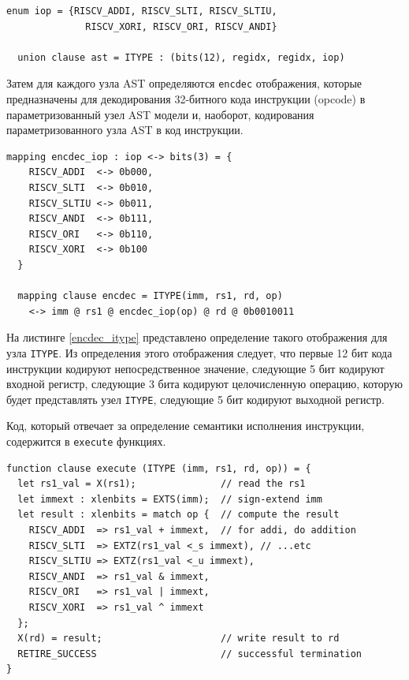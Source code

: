 
\begin{lstlisting}[caption={Пример определения узла AST в sail-riscv}, language=sail, frame=single, label=itype]
  enum iop = {RISCV_ADDI, RISCV_SLTI, RISCV_SLTIU,
              RISCV_XORI, RISCV_ORI, RISCV_ANDI}

  union clause ast = ITYPE : (bits(12), regidx, regidx, iop)
\end{lstlisting}

Затем для каждого узла AST определяются \texttt{encdec} отображения, которые предназначены для декодирования 32-битного кода инструкции (opcode) в параметризованный узел AST модели и, наоборот, кодирования параметризованного узла AST в код инструкции.

\begin{lstlisting}[caption={Пример определения функции кодирования и декодирования инструкций в sail-riscv}, language=sail, frame=single, label=encdec_itype]
  mapping encdec_iop : iop <-> bits(3) = {
    RISCV_ADDI  <-> 0b000,
    RISCV_SLTI  <-> 0b010,
    RISCV_SLTIU <-> 0b011,
    RISCV_ANDI  <-> 0b111,
    RISCV_ORI   <-> 0b110,
    RISCV_XORI  <-> 0b100
  }

  mapping clause encdec = ITYPE(imm, rs1, rd, op)
    <-> imm @ rs1 @ encdec_iop(op) @ rd @ 0b0010011
\end{lstlisting}

На листинге \ref{encdec_itype} представлено определение такого отображения для узла \texttt{ITYPE}.
Из определения этого отображения следует, что первые 12 бит кода инструкции кодируют непосредственное значение, следующие 5 бит кодируют входной регистр, следующие 3 бита кодируют целочисленную операцию, которую будет представлять узел \texttt{ITYPE}, следующие 5 бит кодируют выходной регистр.

Код, который отвечает за определение семантики исполнения инструкции, содержится в \texttt{execute} функциях.

\begin{lstlisting}[caption={Пример определения семантики исполнения инструкций \texttt{addi}, \texttt{slti}, \texttt{sltiu}, \texttt{xori}, \texttt{ori} и \texttt{andi} в sail-riscv}, language=sail, frame=single, label=execute_itype]
function clause execute (ITYPE (imm, rs1, rd, op)) = {
  let rs1_val = X(rs1);               // read the rs1
  let immext : xlenbits = EXTS(imm);  // sign-extend imm
  let result : xlenbits = match op {  // compute the result
    RISCV_ADDI  => rs1_val + immext,  // for addi, do addition
    RISCV_SLTI  => EXTZ(rs1_val <_s immext), // ...etc
    RISCV_SLTIU => EXTZ(rs1_val <_u immext),
    RISCV_ANDI  => rs1_val & immext,
    RISCV_ORI   => rs1_val | immext,
    RISCV_XORI  => rs1_val ^ immext
  };
  X(rd) = result;                     // write result to rd
  RETIRE_SUCCESS                      // successful termination
}
\end{lstlisting}

